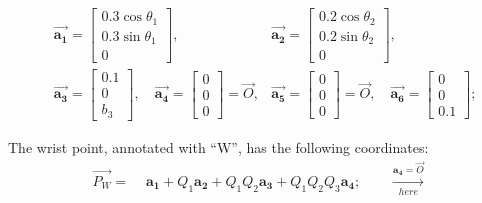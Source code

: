 \documentclass[conference]{IEEEtran}
\begin{document}
\begin{small}
\begin{align*}
         &                                          &  \\
         & \vec{\mathbf{a_1}} =
        \begin{bmatrix}
            0.3\cos\theta_1 \\
            0.3\sin\theta_1 \\
            0
        \end{bmatrix} ,
         & \vec{\mathbf{a_2}} =
        \begin{bmatrix}
            0.2 \cos \theta_2 \\
            0.2 \sin \theta_2 \\
            0
        \end{bmatrix} ,                              \\
         & \vec{\mathbf{a_3}} =
        \begin{bmatrix}
            0.1 \\
            0   \\
            b_3
        \end{bmatrix} , \quad
        \vec{\mathbf{a_4}} =
        \begin{bmatrix}
            0 \\
            0 \\
            0
        \end{bmatrix} = \vec{\mathit{O}} ,
         & \vec{\mathbf{a_5}} =
        \begin{bmatrix}
            0 \\
            0 \\
            0
        \end{bmatrix} = \vec{\mathit{O}} , \quad
        \vec{\mathbf{a_6}} =
        \begin{bmatrix}
            0 \\
            0 \\
            0.1
        \end{bmatrix} ;
    \end{align*}
\end{small}


The wrist point, annotated with ``W'', has the following coordinates:
\begin{align*}
    \vec{\mathbf{\mathit{P_W}}} = & \,\, \mathbf{a_1} + Q_1 \mathbf{a_2} + Q_1 Q_2 \mathbf{a_3} + Q_1 Q_2 Q_3 \mathbf{a_4};
    \quad \quad \xrightarrow[here]{\mathbf{a_4} = \vec{\mathit{O}}}
\end{align*}
\end{document}
